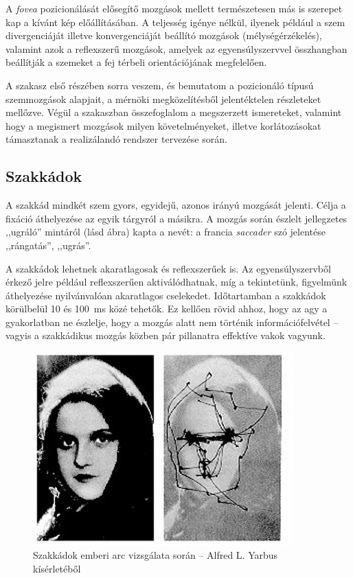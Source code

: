 A \emph{fovea} pozicionálását elősegítő mozgások mellett természetesen más is szerepet kap a kívánt kép előállításában. A teljesség igénye nélkül, ilyenek például a szem divergenciáját illetve konvergenciáját beállító mozgások (mélységérzékelés), valamint azok a reflexszerű mozgások, amelyek az egyensúlyszervvel összhangban beállítják a szemeket a fej térbeli orientációjának megfelelően.

\bigskip

A szakasz első részében sorra veszem, és bemutatom a pozicionáló típusú szemmozgások alapjait, a mérnöki megközelítésből jelentéktelen részleteket mellőzve. Végül a  szakaszban összefoglalom a megszerzett ismereteket, valamint hogy a megismert mozgások milyen követelményeket, illetve korlátozásokat támasztanak a realizálandó rendszer tervezése során.

\subsection{Szakkádok}\label{sect:szakkadok}

A szakkád mindkét szem gyors, egyidejű, azonos irányú mozgását jelenti. Célja a fixáció áthelyezése az egyik tárgyról a másikra. A mozgás során észlelt jellegzetes ,,ugráló'' mintáról (lásd  ábra) kapta a nevét: a francia \emph{saccader} szó jelentése ,,rángatás'', ,,ugrás''.

A szakkádok lehetnek akaratlagosak és reflexszerűek is. Az egyensúlyszervből érkező jelre például reflexszerűen aktiválódhatnak, míg a tekintetünk, figyelmünk áthelyezése nyilvánvalóan akaratlagos cselekedet. Időtartamban a szakkádok körülbelül 10 és 100~ms közé tehetők. Ez kellően rövid ahhoz, hogy az agy a gyakorlatban ne észlelje, hogy a mozgás alatt nem történik információfelvétel -- vagyis a szakkádikus mozgás közben pár pillanatra effektíve vakok vagyunk. \cite{shebilske}

\begin{figure}[!ht]
\centering
\includegraphics[width=100mm, keepaspectratio]{figures/yarbus_saccadic.jpg}
\caption{Szakkádok emberi arc vizsgálata során -- Alfred L. Yarbus kísérletéből}
\label{fig:yarbus_saccadic}
\end{figure}

